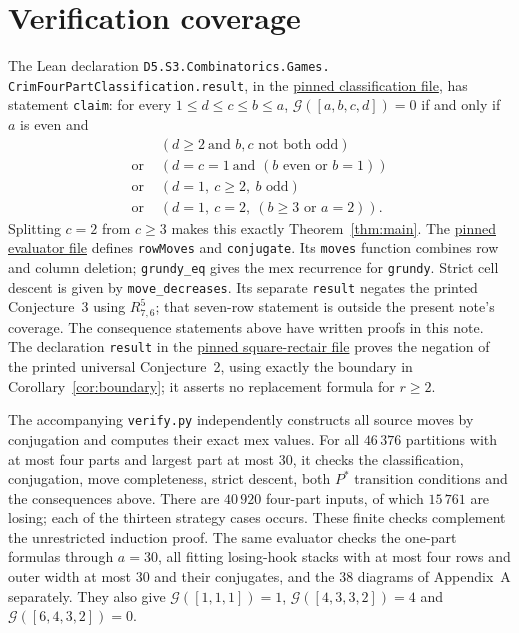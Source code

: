 \documentclass[11pt]{article}
\newcommand{\G}{\mathcal G}
\begin{document}
\section{Verification coverage}
The Lean declaration
\texttt{D5.S3.Combinatorics.Games.}\allowbreak
\texttt{CrimFourPartClassification.result}, in the
\href{https://github.com/the-omega-institute/trureturing/blob/e0da8fcc80226febc4e7ea0836927bc71d158292/D5/S3/Combinatorics/Games/CrimFourPartClassification.lean}{pinned classification file},
has statement \texttt{claim}: for every $1\le d\le c\le b\le a$,
$\G([a,b,c,d])=0$ if and only if $a$ is even and
\begin{align*}
 &(d\ge2\ \text{and $b,c$ not both odd})\\
 {}\text{or }&(d=c=1\ \text{and $(b\text{ even or }b=1)$})\\
 {}\text{or }&(d=1,\ c\ge2,\ b\text{ odd})\\
 {}\text{or }&(d=1,\ c=2,\ (b\ge3\text{ or }a=2)).
\end{align*}
Splitting $c=2$ from $c\ge3$ makes this exactly
Theorem~\ref{thm:main}. The
\href{https://github.com/the-omega-institute/trureturing/blob/e0da8fcc80226febc4e7ea0836927bc71d158292/D5/S0/Certificates/Games/CrimGrundyRefutation.lean}{pinned evaluator file}
defines \texttt{rowMoves} and \texttt{conjugate}.
Its \texttt{moves} function combines row and column deletion;
\texttt{grundy\_eq} gives the mex recurrence for \texttt{grundy}.
Strict cell descent is given by \texttt{move\_decreases}.
Its separate \texttt{result} negates the printed Conjecture~3 using
$R^5_{7,6}$; that seven-row statement is outside the present note's coverage.
The consequence statements above have written proofs in this note.
The declaration \texttt{result} in the
\href{https://github.com/the-omega-institute/trureturing/blob/e0da8fcc80226febc4e7ea0836927bc71d158292/D5/S0/Certificates/Games/CrimRectairSquareBoundaryRefutation.lean}{pinned square-rectair file}
proves the negation of the printed universal Conjecture~2, using exactly
the boundary in Corollary~\ref{cor:boundary}; it asserts no replacement
formula for $r\ge2$.

The accompanying \texttt{verify.py} independently constructs all source
moves by conjugation and computes their exact mex values.
For all $46\,376$ partitions with at most four parts and largest part
at most $30$, it checks the classification, conjugation, move completeness,
strict descent, both $P^*$ transition conditions and the consequences above.
There are $40\,920$ four-part inputs, of which $15\,761$ are losing;
each of the thirteen strategy cases occurs.
These finite checks complement the unrestricted induction proof.
The same evaluator checks the one-part formulas through $a=30$, all
fitting losing-hook stacks with at most four rows and outer width at most
$30$ and their conjugates, and the 38 diagrams of Appendix~A separately.
They also give
$\G([1,1,1])=1$, $\G([4,3,3,2])=4$ and $\G([6,4,3,2])=0$.
\end{document}
